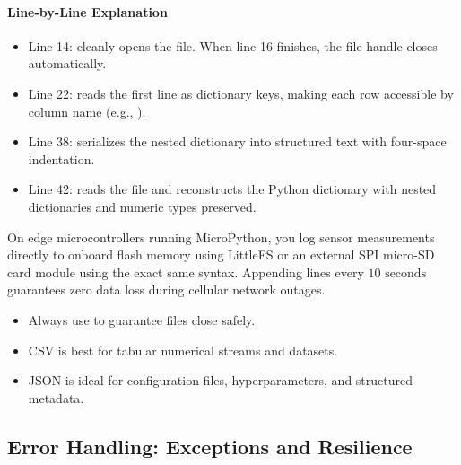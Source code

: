\paragraph{Line-by-Line Explanation}
\begin{itemize}
    \item Line 14:  cleanly opens the file. When line 16 finishes, the file handle closes automatically.
    \item Line 22:  reads the first line as dictionary keys, making each row accessible by column name (e.g., ).
    \item Line 38:  serializes the nested dictionary into structured text with four-space indentation.
    \item Line 42:  reads the file and reconstructs the Python dictionary with nested dictionaries and numeric types preserved.
\end{itemize}

\begin{iotbox}
On edge microcontrollers running MicroPython, you log sensor measurements directly to onboard flash memory using LittleFS or an external SPI micro-SD card module using the exact same  syntax. Appending lines every $10\text{ seconds}$ guarantees zero data loss during cellular network outages.
\end{iotbox}

\begin{takeaways}
\begin{itemize}
    \item Always use  to guarantee files close safely.
    \item CSV is best for tabular numerical streams and datasets.
    \item JSON is ideal for configuration files, hyperparameters, and structured metadata.
\end{itemize}
\end{takeaways}

\subsection{Error Handling: Exceptions and Resilience}


